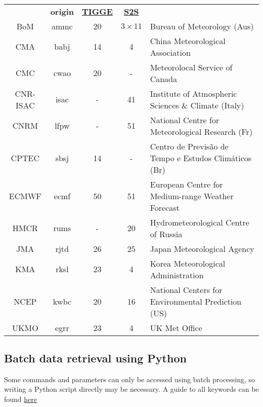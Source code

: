 \documentclass[10pt,fleqn]{article}
\begin{document}
\begin{framed}

 \\[10pt]
\begin{tabular}{c>{\ttfamily}cccl}
& \textbf{origin}& \textbf{\href{https://software.ecmwf.int/wiki/display/TIGGE/Models}{TIGGE}} & \textbf{\href{https://software.ecmwf.int/wiki/display/S2S/Models}{S2S}} & \\
BoM & ammc &20 &$3\times11$ & Bureau of Meteorology (Aus) \\
CMA & babj &14 &4 & China Meteorological Association \\
CMC & cwao &20 &-& Meteorolocal Service of Canada \\
CNR-ISAC & isac &-&41 & Institute of Atmospheric Sciences \& Climate (Italy)\\
CNRM & lfpw &-&51 & National Centre for Meteorological Research (Fr)\\
CPTEC & sbsj &14 &-& Centro de Previs\~{a}o de Tempo e Estudos Clim\'{a}ticos (Br) \\
ECMWF & ecmf &50 &51 &  European Centre for Medium-range Weather Forecast \\
HMCR & rums &-&20 & Hydrometeorological Centre of Russia\\
JMA & rjtd &26 &25 & Japan Meteorological Agency \\
KMA & rksl & 23 & 4 & Korea Meteorological Administration\\
NCEP & kwbc &20 &16 & National Centers for Environmental Prediction (US) \\
UKMO & egrr &23 &4 & UK Met Office\\
\end{tabular}

\end{framed}

\newpage
\subsection{Batch data retrieval using Python}
Some commands and parameters can only be accessed using batch processing, so writing a Python script directly may be necessary. A guide to all keywords can be found \href{https://software.ecmwf.int/wiki/display/UDOC/Identification+keywords#Identificationkeywords-class}{here}\\[7pt]
\end{document}
